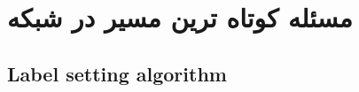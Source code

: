  \chapter[کوتاه ترین مسیر]{مسئله کوتاه ترین مسیر در شبکه}
 	\section[\LR{Label setting algorithm}]{Label setting algorithm}
 	\section[\LR{Label correcting algorithm}]{}